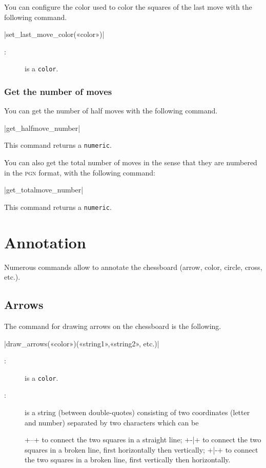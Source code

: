 \documentclass[english]{ltxdoc}
\begin{document}
You can configure the color used to color the squares of the last
move with the following command.

\commande|set_last_move_color(«color»)|\smallskip
\begin{description}
  \item[:] is a \MP{} \lstinline+color+.
\end{description}



\subsubsection{Get the number of moves}

You can get the number of half moves with the following command.

\commande|get_halfmove_number|\smallskip

This command returns a \lstinline+numeric+.

You can also get the total number of moves in the sense that they are numbered
in the \textsc{pgn} format, with the following command:

\commande|get_totalmove_number|\smallskip

This command returns a \lstinline+numeric+.

\section{Annotation}

Numerous commands allow to annotate the chessboard (arrow, color, circle, cross,
etc.).

\subsection{Arrows}

The command for drawing arrows on the chessboard is the following.

\commande|draw_arrows(«color»)(«string1»,«string2», etc.)|\smallskip
\begin{description}
\item[:] is a \MP{} \lstinline+color+.
\item[:] is a string (between double-quotes) consisting of two
coordinates (letter and number) separated by two characters which can be 
\begin{description}
\vitem+--+ to connect the two squares in a straight line;
\vitem+-|+ to connect the two squares in a broken line, first horizontally then
vertically; 
\vitem+|-+ to connect the two squares in a broken line, first vertically then
horizontally. 
\end{description}
\end{description}
\end{document}
